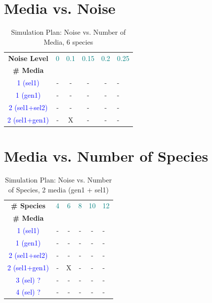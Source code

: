 \documentclass[10pt,A4paper]{article}
\newcommand{\chng}[1]{\textcolor{blue} {#1}}
\newcommand{\chngn}[1]{\textcolor{teal} {#1}}
\begin{document}
\section{Media vs. Noise}
\begin{table}[htbp]
\centering
\caption{Simulation Plan: Noise vs. Number of Media, 6 species}    
\begin{tabular}{@{} cccccl @{}}
\toprule
\textbf{Noise Level} & \chngn{0} & \chngn{0.1}& \chngn{0.15} & \chngn{0.2} & \chngn{0.25} \\
\textbf{\# Media} & & & & & \\
\midrule
\chng{1 (sel1)}      & - & - & - & - & - \\
\chng{1 (gen1)}      & - & - & - & - & - \\
\chng{2 (sel1+sel2)} & - & - & - & - & - \\
\chng{2 (sel1+gen1)} & - & X & - & - & - \\
\bottomrule
\end{tabular}
\label{tab:simulation-plan-media-noise}
\end{table}
\newpage
\section{Media vs. Number of Species}
\begin{table}[htbp]
\centering
\caption{Simulation Plan: Noise vs. Number of Species, 2 media (gen1 + sel1)}    
\begin{tabular}{@{} cccccl @{}}
\toprule
\textbf{\# Species} & \chngn{4} & \chngn{6}& \chngn{8} & \chngn{10} & \chngn{12} \\
\textbf{\# Media} & & & & & \\
\midrule
\chng{1 (sel1)}      & - & - & - & - & - \\
\chng{1 (gen1)}      & - & - & - & - & - \\
\chng{2 (sel1+sel2)} & - & - & - & - & - \\
\chng{2 (sel1+gen1)} & - & X & - & - & - \\
\chng{3 (sel) ?}     & - & - & - & - & - \\
\chng{4 (sel) ?}     & - & - & - & - & - \\
\bottomrule
\end{tabular}
\label{tab:simulation-plan-media-species}
\end{table}
\end{document}
